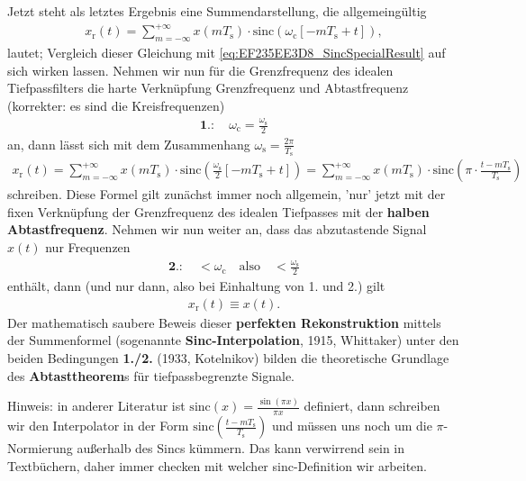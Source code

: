 \begin{mdframed}
Jetzt steht als letztes Ergebnis eine Summendarstellung, die allgemeingültig
\begin{align}
x_\mathrm{r}(t)
= \sum_{m=-\infty}^{+\infty} x(m T_\mathrm{s}) \cdot \mathrm{sinc}(\omega_\mathrm{c} [-m T_\mathrm{s} + t]),
\end{align}
lautet; Vergleich dieser Gleichung mit \eqref{eq:EF235EE3D8_SincSpecialResult} auf sich wirken lassen.
Nehmen wir nun für die Grenzfrequenz des idealen Tiefpassfilters die harte Verknüpfung Grenzfrequenz und Abtastfrequenz (korrekter: es sind die Kreisfrequenzen)
\begin{align}
\textbf{1.}:\quad\omega_\mathrm{c} = \frac{\omega_\mathrm{s}}{2}
\end{align}
an, dann lässt sich mit dem Zusammenhang
$\omega_\mathrm{s} = \frac{2\pi}{T_\mathrm{s}}$
\begin{align}
\label{eq:EF235EE3D8:ZeitSincInterpolation}
x_\mathrm{r}(t)=
\sum_{m=-\infty}^{+\infty} x(m T_\mathrm{s}) \cdot \mathrm{sinc}(\frac{\omega_\mathrm{s}}{2} [-m T_\mathrm{s} + t])=
\sum_{m=-\infty}^{+\infty} x(m T_\mathrm{s}) \cdot \mathrm{sinc}\left(\pi \cdot \frac{t-m T_\mathrm{s}}{T_\mathrm{s}}\right)
\end{align}
schreiben. Diese Formel gilt zunächst immer noch allgemein, 'nur' jetzt mit der
fixen Verknüpfung der Grenzfrequenz des idealen Tiefpasses mit der \textbf{halben Abtastfrequenz}.
Nehmen wir nun weiter an, dass das abzutastende Signal $x(t)$ nur Frequenzen
\begin{align}
\textbf{2.}:\quad<\omega_\mathrm{c}\quad\text{also}\quad<\frac{\omega_\mathrm{s}}{2}
\end{align}
enthält, dann (und nur dann, also bei Einhaltung von 1. und 2.) gilt
\begin{align}
x_\mathrm{r}(t) \equiv x(t).
\end{align}
Der mathematisch saubere Beweis dieser \textbf{perfekten Rekonstruktion}
mittels der Summenformel (sogenannte \textbf{Sinc-Interpolation}, 1915, Whittaker)
unter den beiden Bedingungen \textbf{1./2.} (1933, Kotelnikov) bilden die theoretische
Grundlage des \textbf{Abtasttheorem}s für tiefpassbegrenzte Signale.
%

Hinweis: in anderer Literatur ist $\mathrm{sinc}(x)=\frac{\sin(\pi x)}{\pi x}$ definiert,
dann schreiben wir den Interpolator in der Form
$\mathrm{sinc}\left(\frac{t-m T_\mathrm{s}}{T_\mathrm{s}}\right)$ und müssen uns
noch um die $\pi$-Normierung außerhalb des Sincs kümmern. Das kann verwirrend sein
in Textbüchern, daher immer checken mit welcher sinc-Definition wir arbeiten.
\end{mdframed}


